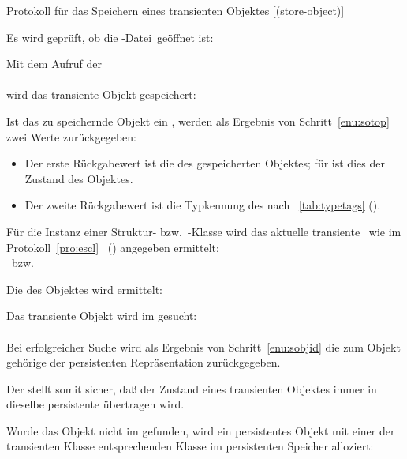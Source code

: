 \begin{infol}%
%
\acaption%
 {Protokoll f\"{u}r das Speichern eines transienten Objektes}%
 [(store-object)]%
 \label{pro:sobj}%
%
\item Es wird gepr\"{u}ft, ob die \sh-Datei\ ge\"{o}ffnet ist:\\
%
\item\label{enu:sotop} Mit dem Aufruf der \gfn[n]\\
\\
wird das transiente Objekt gespeichert:
%
\begin{block}%
%
\item Ist das zu speichernde Objekt ein \immval, werden als Ergebnis
von Schritt~\ref{enu:sotop} zwei Werte zur\"{u}ckgegeben:
\begin{itemize}
%
\item Der erste R\"{u}ckgabewert ist die \sobjid\/ des gespeicherten
Objektes; f\"{u}r \immval[s]\/ ist dies der Zustand des Objektes.
%
\item Der zweite R\"{u}ckgabewert ist die Typkennung des
\immval[s]\/ nach \tablename~\ref{tab:typetags}
(\citepage{\pageref{tab:typetags}}).
%
\end{itemize}
%
\item\label{enu:sobjed} F\"{u}r die Instanz einer Struktur-
bzw.\ \clos-Klasse wird das aktuelle transiente \clsdo\ wie im
Protokoll~\ref{pro:escl}
\stfn{\enscldescr}\ (\citepage{\pageref{pro:escl}}) angegeben
ermittelt:\\
\stfn{\ensstdescr}\ bzw.\ \stfn{\enscldescr}
%
\item\label{enu:sobjid} Die \sobjid\/ des Objektes wird ermittelt:
%
\begin{block}%
%
\item Das transiente Objekt wird im \cache\/ gesucht:\\
\\
Bei erfolgreicher Suche wird als Ergebnis von Schritt~\ref{enu:sobjid}
die zum Objekt geh\"{o}rige \sobjid\/ der persistenten Repr\"{a}sentation
zur\"{u}ckgegeben.
\par{}Der \cache\/ stellt somit sicher, da\ss{} der Zustand eines
transienten Objektes immer in dieselbe persistente
\representation{} \"{u}bertragen wird.
%
\item Wurde das Objekt nicht im \cache\/ gefunden, wird ein
persistentes Objekt mit einer der transienten Klasse entsprechenden
Klasse im persistenten Speicher alloziert:\\

\end{block}
\end{block}
\end{infol}

